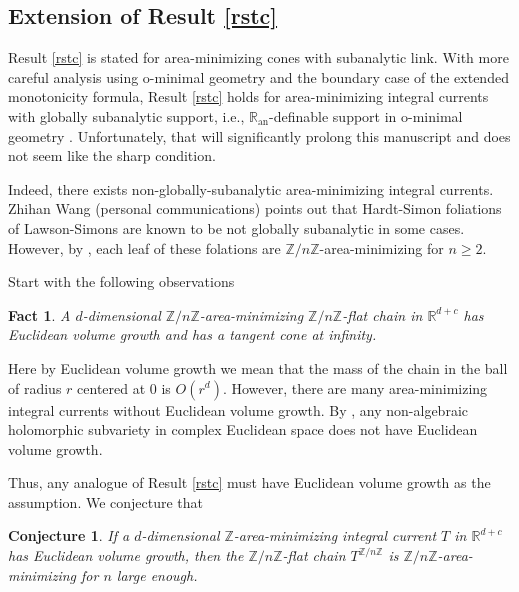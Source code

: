 \documentclass[11pt,a4paper]{amsart}
\numberwithin{equation}{section}
\newcommand{\ran}{\mathbb{R}_{\operatorname{an}}}
\newcommand{\R}{\mathbb{R}}
\newcommand{\Z}{\mathbb{Z}}
\theoremstyle{plain}
\newtheorem{fact}{Fact}[subsection]
\newtheorem{conj}{Conjecture}
\theoremstyle{definition}
\numberwithin{equation}{subsection}
\begin{document}
\subsection{Extension of Result \ref{rstc}}
Result \ref{rstc} is stated for area-minimizing cones with subanalytic link. With more careful analysis using o-minimal geometry and the boundary case of the extended monotonicity formula, Result \ref{rstc} holds for area-minimizing integral currents with globally subanalytic support, i.e., $\ran$-definable support in o-minimal geometry \cite{MComin,VDDom}. Unfortunately, that will significantly prolong this manuscript and does not seem like the sharp condition.

Indeed, there exists non-globally-subanalytic area-minimizing integral currents. Zhihan Wang (personal communications) points out that Hardt-Simon foliations of Lawson-Simons \cite{HS} are known to be not globally subanalytic in some cases. However, by \cite{FMeu}, each leaf of these folations are $\Z/n\Z$-area-minimizing for $n\ge 2$.

 Start with the following observations
\begin{fact}\cite[3.3 Lemma]{FMvbd}
	A $d$-dimensional $\Z/n\Z$-area-minimizing $\Z/n\Z$-flat chain in $\R^{d+c}$ has Euclidean volume growth and has a tangent cone at infinity.
\end{fact}
Here by Euclidean volume growth we mean that the mass of the chain in the ball of radius $r$ centered at $0$ is $O(r^d)$. However, there are many area-minimizing integral currents without Euclidean volume growth. By \cite{EWa,WSa}, any non-algebraic holomorphic subvariety in complex Euclidean space does not have Euclidean volume growth.

Thus, any analogue of Result \ref{rstc} must have Euclidean volume growth as the assumption. We conjecture that
\begin{conj}
If a $d$-dimensional $\Z$-area-minimizing integral current $T$ in $\R^{d+c}$ has Euclidean volume growth, then the $\Z/n\Z$-flat chain $T^{\Z/n\Z}$ is $\Z/n\Z$-area-minimizing for $n$ large enough.	
\end{conj} 
\end{document}
